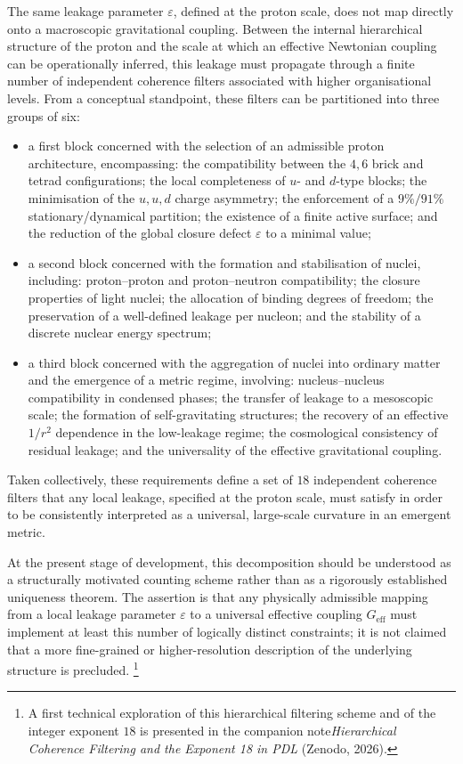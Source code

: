 \documentclass[11pt,a4paper]{article}
\begin{document}
The same leakage parameter $\varepsilon$, defined at the proton scale, does not map directly onto a macroscopic gravitational coupling. Between the internal hierarchical structure of the proton and the scale at which an effective Newtonian coupling can be operationally inferred, this leakage must propagate through a finite number of independent coherence filters associated with higher organisational levels. From a conceptual standpoint, these filters can be partitioned into three groups of six:

\begin{itemize}
  \item a first block concerned with the selection of an admissible proton architecture, encompassing: the compatibility between the $4,6$ brick and tetrad configurations; the local completeness of $u$- and $d$-type blocks; the minimisation of the $u,u,d$ charge asymmetry; the enforcement of a $9\%/91\%$ stationary/dynamical partition; the existence of a finite active surface; and the reduction of the global closure defect $\varepsilon$ to a minimal value;
  \item a second block concerned with the formation and stabilisation of nuclei, including: proton--proton and proton--neutron compatibility; the closure properties of light nuclei; the allocation of binding degrees of freedom; the preservation of a well-defined leakage per nucleon; and the stability of a discrete nuclear energy spectrum;
  \item a third block concerned with the aggregation of nuclei into ordinary matter and the emergence of a metric regime, involving: nucleus--nucleus compatibility in condensed phases; the transfer of leakage to a mesoscopic scale; the formation of self-gravitating structures; the recovery of an effective $1/r^2$ dependence in the low-leakage regime; the cosmological consistency of residual leakage; and the universality of the effective gravitational coupling.
\end{itemize}

Taken collectively, these requirements define a set of $18$ independent coherence filters that any local leakage, specified at the proton scale, must satisfy in order to be consistently interpreted as a universal, large-scale curvature in an emergent metric.

At the present stage of development, this decomposition should be understood as a structurally motivated counting scheme rather than as a rigorously established uniqueness theorem. The assertion is that any physically admissible mapping from a local leakage parameter $\varepsilon$ to a universal effective coupling $G_{\mathrm{eff}}$ must implement at least this number of logically distinct constraints; it is not claimed that a more fine-grained or higher-resolution description of the underlying structure is precluded. \footnote{A first technical exploration of this hierarchical filtering scheme and of the integer exponent $18$ is presented in the companion note\emph{Hierarchical Coherence Filtering and the Exponent 18 in PDL} (Zenodo, 2026).}
\end{document}
